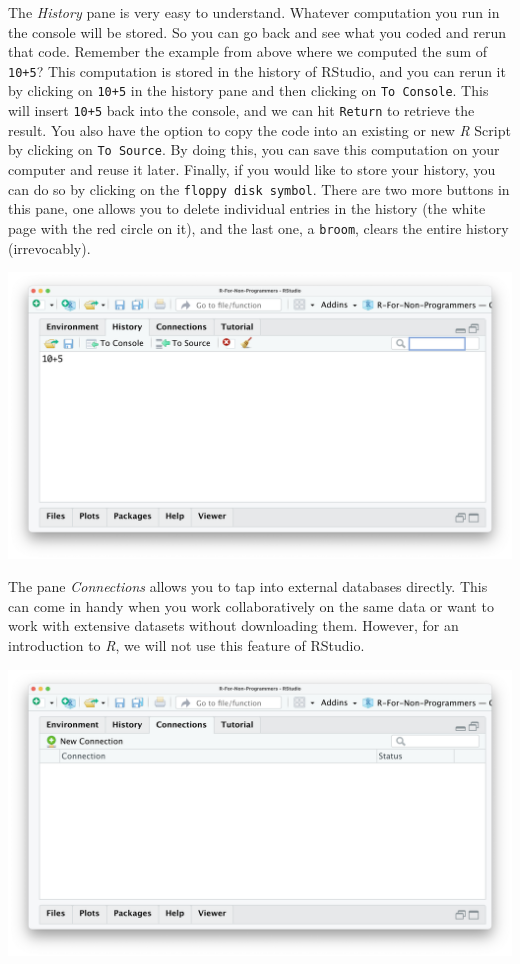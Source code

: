 \documentclass[
  letterpaper,
  DIV=11,
  numbers=noendperiod]{scrreprt}
\begin{document}
The \emph{History} pane is very easy to understand. Whatever computation
you run in the console will be stored. So you can go back and see what
you coded and rerun that code. Remember the example from above where we
computed the sum of \texttt{10+5}? This computation is stored in the
history of RStudio, and you can rerun it by clicking on \texttt{10+5} in
the history pane and then clicking on \texttt{To\ Console}. This will
insert \texttt{10+5} back into the console, and we can hit
\texttt{Return} to retrieve the result. You also have the option to copy
the code into an existing or new \emph{R} Script by clicking on
\texttt{To\ Source}. By doing this, you can save this computation on
your computer and reuse it later. Finally, if you would like to store
your history, you can do so by clicking on the
\texttt{floppy\ disk\ symbol}. There are two more buttons in this pane,
one allows you to delete individual entries in the history (the white
page with the red circle on it), and the last one, a \texttt{broom},
clears the entire history (irrevocably).

\includegraphics{images/chapter_04_img/04_environment_history_etc/02_rstudio_history.png}

The pane \emph{Connections} allows you to tap into external databases
directly. This can come in handy when you work collaboratively on the
same data or want to work with extensive datasets without downloading
them. However, for an introduction to \emph{R}, we will not use this
feature of RStudio.

\includegraphics{images/chapter_04_img/04_environment_history_etc/03_rstudio_connections.png}
\end{document}
